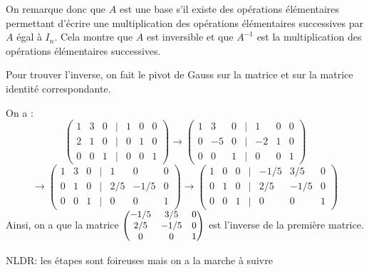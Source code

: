 \documentclass[a4paper, titlepage]{article}
\begin{document}
	On remarque donc que $A$ est une base s'il existe des opérations élémentaires permettant d'écrire une multiplication des opérations élémentaires successives par $A$ égal à $I_n$. Cela montre que $A$ est inversible et que $A^{-1}$ est la multiplication des opérations élémentaires successives.

	Pour trouver l'inverse, on fait le pivot de Gauss sur la matrice et sur la matrice identité correspondante.

	\begin{exemple}
		On a :
		$$ \begin{pmatrix} 1&3&0&|&1&0&0\\ 2&1&0&|&0&1&0\\0&0&1&|&0&0&1 \end{pmatrix} \rightarrow \begin{pmatrix} 1&3&0&|&1&0&0\\ 0&-5&0&|&-2&1&0\\0&0&1&|&0&0&1 \end{pmatrix} $$
		$$\rightarrow \begin{pmatrix} 1&3&0&|&1&0&0\\ 0&1&0&|&2/5&-1/5&0\\0&0&1&|&0&0&1 \end{pmatrix}\rightarrow  \begin{pmatrix} 1&0&0&|&-1/5&3/5&0\\ 0&1&0&|&2/5&-1/5&0\\0&0&1&|&0&0&1 \end{pmatrix}$$
		Ainsi, on a que la matrice $\small\begin{pmatrix}-1/5&3/5&0\\2/5&-1/5&0\\0&0&1 \end{pmatrix}$ est l'inverse de la première matrice. 

		NLDR: les étapes sont foireuses mais on a la marche à suivre
	\end{exemple}
\end{document}
